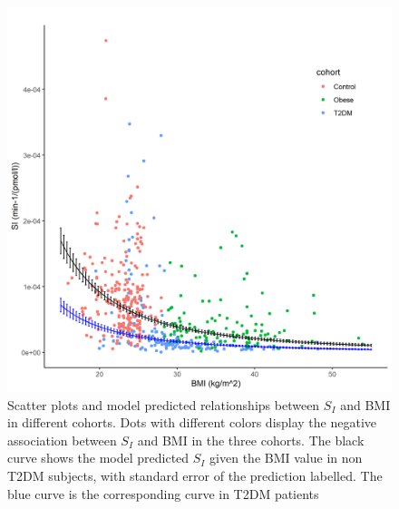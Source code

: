 \documentclass[utf8]{frontiersSCNS} %
\begin{document}
\begin{figure}[h!]
\begin{center}
\includegraphics[width=15cm]{SI_BMI.PNG}
\end{center}
\caption{Scatter plots and model predicted relationships between $S_I$ and BMI in different cohorts. Dots with different colors display the negative association between $S_I$ and BMI in the three cohorts. The black curve shows the model predicted $S_I$ given the BMI value in non T2DM subjects, with standard error of the prediction labelled. The blue curve is the corresponding curve in T2DM patients}
\label{fig: SI_BMI}
\end{figure}
\end{document}
